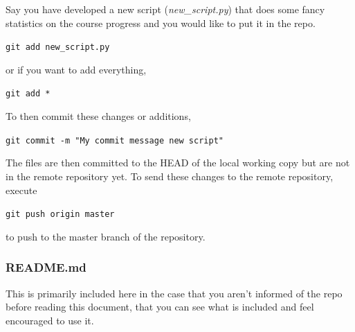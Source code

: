 \documentclass[12pt]{article}
\begin{document}
Say you have developed a new script (\emph{new\_script.py}) that does some fancy statistics on the course progress and you would like to put it in the repo.

\begin{mdframed}[style=CommandFrame]
\texttt{git add new\_script.py}
\end{mdframed}

\noindent or if you want to add everything,

\begin{mdframed}[style=CommandFrame]
\texttt{git add *}
\end{mdframed}

\noindent To then commit these changes or additions,

\begin{mdframed}[style=CommandFrame]
\texttt{git commit -m "My commit message new script"}
\end{mdframed}

\noindent The files are then committed to the HEAD of the local working copy but are not in the remote repository yet. To send these changes to the remote repository, execute

\begin{mdframed}[style=CommandFrame]
\texttt{git push origin master}
\end{mdframed}

\noindent to push to the master branch of the repository.

\subsubsection{README.md} \label{sec:readme}

This is primarily included here in the case that you aren't informed of the repo before reading this document, that you can see what is included and feel encouraged to use it.
\end{document}
